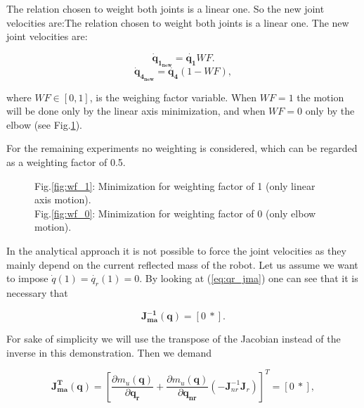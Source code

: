 The relation chosen to weight both joints is a linear one. So the new joint velocities are:The relation chosen to weight both joints is a linear one. The new joint velocities are:

\begin{equation}
\mathbf{\dot{q}_{1_{new}}}  = \mathbf{\dot{q_{1}}}WF.
\end{equation} 
\begin{equation}
\mathbf{\dot{q}_{4_{new}} }= \mathbf{\dot{q_{4}}}(1-WF),
\end{equation}


where $WF \in [0,1]$, is the weighing factor variable.
When $WF=1$ the motion will be done only by the linear axis minimization, and when $WF=0$ only by the elbow (see Fig.\ref{fig:wf}).

For the  remaining experiments no weighting is considered, which can be regarded as a weighting factor of 0.5.

\begin{figure}[!h]
	\centering	
	 	 	 	
	\caption{Fig.\ref{fig:wf_1}: Minimization for weighting factor of 1 (only  linear axis motion). \\ Fig.\ref{fig:wf_0}: Minimization for weighting factor of 0 (only elbow motion). }
	\label{fig:wf}
\end{figure}

In the analytical approach it is not possible to force the joint velocities as they mainly depend on the current reflected mass of the robot. Let us assume we want to impose  $\dot{q}(1) = \dot{q_r}(1) = 0$. By looking at  (\ref{eq:qr_jma}) one can
see that it is necessary that

\begin{equation}
\mathbf{J_{ma}^{-1}}(\mathbf{q}) = [0 \ 	  *].
\end{equation} 

For sake of simplicity we will use the transpose of the Jacobian instead of the inverse in this demonstration. Then we demand


\begin{equation}
\mathbf{J_{ma}^{T}}(\mathbf{q}) = \left[ \frac{\partial {m_u(\mathbf{q})}}{\partial{\mathbf{q_{r}}}} + \frac{\partial {m_u(\mathbf{q})}}{\partial{\mathbf{q_{nr}}}}  (- \mathbf{J}_{nr}^{-1} \mathbf{J}_r) \right ]^{T}= [0 \ 	  *] ,
\end{equation}

